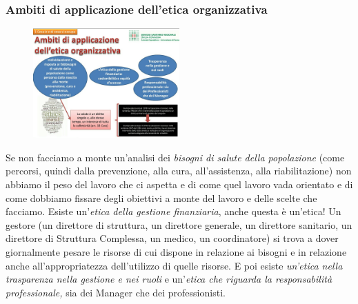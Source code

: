 \subsubsection{Ambiti di applicazione dell'etica organizzativa}

 \begin{figure}[!ht]
\centering
	\includegraphics[width=0.5\textwidth]{32/image4.jpeg}
	\end{figure}

Se non facciamo a monte un'analisi dei \emph{bisogni di salute della
popolazione} (come percorsi, quindi dalla prevenzione, alla cura,
all'assistenza, alla riabilitazione) non abbiamo il peso del lavoro che
ci aspetta e di come quel lavoro vada orientato e di come dobbiamo
fissare degli obiettivi a monte del lavoro e delle scelte che facciamo.
Esiste un'\emph{etica della gestione finanziaria}, anche questa è
un'etica! Un gestore (un direttore di struttura, un direttore generale,
un direttore sanitario, un direttore di Struttura Complessa, un medico,
un coordinatore) si trova a dover giornalmente pesare le risorse di cui
dispone in relazione ai bisogni e in relazione anche all'appropriatezza
dell'utilizzo di quelle risorse. E poi esiste \emph{un'etica nella
trasparenza nella gestione e nei ruoli} e un'\emph{etica che riguarda la
responsabilità professionale,} sia dei Manager che dei professionisti.

